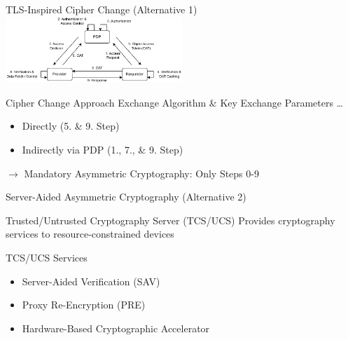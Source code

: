 \documentclass[en]{sdqbeamer}
\begin{document}
\begin{frame}{TLS-Inspired Cipher Change (Alternative 1)}
    \centering
    \includegraphics[width=0.5\textwidth]{./figures/access_control_request_delegation.drawio.pdf}
    \begin{greenblock}{Cipher Change Approach}
        Exchange Algorithm \& Key Exchange Parameters \dots
        \begin{itemize}
            \item Directly (5. \& 9. Step)
            \item Indirectly via PDP (1., 7., \& 9. Step)
        \end{itemize}
        $\rightarrow$ Mandatory Asymmetric Cryptography: Only Steps 0-9
    \end{greenblock}
\end{frame}

\begin{frame}{Server-Aided Asymmetric Cryptography (Alternative 2)}
    \begin{greenblock}{Trusted/Untrusted Cryptography Server (TCS/UCS)}
        Provides cryptography services to resource-constrained devices
    \end{greenblock}
    \begin{blueblock}{TCS/UCS Services}
        \begin{itemize}
            \item Server-Aided Verification (SAV) \parencite{Girault2005}
            \item Proxy Re-Encryption (PRE) \parencite{Green2007}
            \item Hardware-Based Cryptographic Accelerator
        \end{itemize}
    \end{blueblock}
\end{frame}
\end{document}
